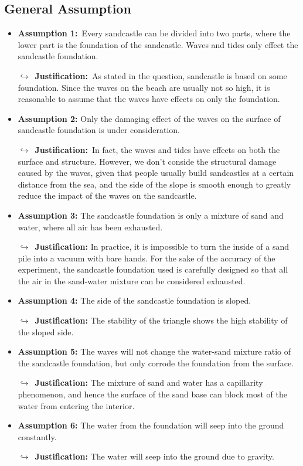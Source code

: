 \documentclass{mcmthesis}		    %
\begin{document}
	\subsection{General Assumption }  	
	\begin{itemize} 		
	\setlength{\parskip}{0em} 	
	\item \textbf{Assumption 1:}~Every sandcastle can be divided into two parts, where the lower part is the foundation of the sandcastle. Waves and tides only effect the sandcastle foundation.
	
		$\hookrightarrow$~\textbf{Justification:}~As stated in the question, sandcastle is based on some foundation. Since the waves on the beach are usually not so high, it is reasonable to assume that the waves have effects on only the foundation. 
	
	\item \textbf{Assumption 2:} Only the damaging effect of the waves on the surface of sandcastle foundation is under consideration.
	
	$\hookrightarrow$~\textbf{Justification:}~In fact, the waves and tides have effects on both the surface and structure. However, we don't conside the structural damage caused by the waves, given that people usually build sandcastles at a certain distance from the sea, and the side of the slope is smooth enough to greatly reduce the impact of the waves on the sandcastle.
	
	\item \textbf{Assumption 3:} The sandcastle foundation is only a mixture of sand and water, where all air has been exhausted.
	
	$\hookrightarrow$~\textbf{Justification:} In practice, it is impossible to turn the inside of a sand pile into a vacuum with bare hands. For the sake of the accuracy of the experiment, the sandcastle foundation used is carefully designed so that all the air in the sand-water mixture can be considered exhausted.
	
    \item \textbf{Assumption 4:} The side of the sandcastle foundation is sloped.
    
    $\hookrightarrow$~\textbf{Justification:} The stability of the triangle shows the high stability of the sloped side.
    
    \item \textbf{Assumption 5:} The waves will not change the water-sand mixture ratio of the sandcastle foundation, but only corrode the foundation from the surface.
    
    $\hookrightarrow$~\textbf{Justification:} The mixture of sand and water has a capillarity phenomenon, and hence the surface of the sand base can block most of the water from entering the interior.
    
    \item \textbf{Assumption 6:} The water from the foundation will seep into the ground constantly.
    
    $\hookrightarrow$~\textbf{Justification:} The water will seep into the ground due to gravity.
	\end{itemize}
\end{document}

